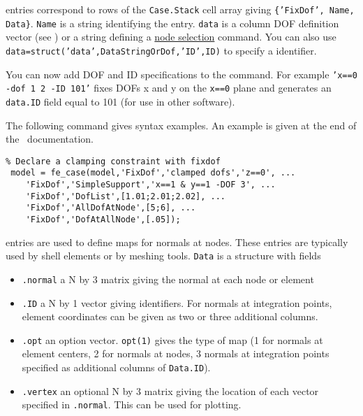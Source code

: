 
 entries correspond to rows of the {\tt Case.Stack} cell array giving {\tt \{'FixDof', Name, Data\}}. {\tt Name} is a string identifying the entry. {\tt data} is a column DOF definition vector (see ) or a string defining a \hyperlink{findnode}{node selection} command. You can also use \\{\tt data=struct('data',DataStringOrDof,'ID',ID)} to specify a identifier.

You can now add DOF and ID specifications to the  command. For example {\tt 'x==0 -dof 1 2 -ID 101'} fixes DOFs x and y on the {\tt x==0} plane and generates an {\tt data.ID} field equal to 101 (for use in other software).

The following command gives syntax examples. An example is given at the end of the \fecase\ documentation.

\begin{verbatim}
% Declare a clamping constraint with fixdof
 model = fe_case(model,'FixDof','clamped dofs','z==0', ...
    'FixDof','SimpleSupport','x==1 & y==1 -DOF 3', ...
    'FixDof','DofList',[1.01;2.01;2.02], ...
    'FixDof','AllDofAtNode',[5;6], ...
    'FixDof','DofAtAllNode',[.05]);
\end{verbatim}



 entries are used to define maps for normals at nodes. These entries are typically used by shell elements or by meshing tools. {\tt Data} is a structure with fields

\begin{itemize}
 \item {\tt .normal} a N by 3 matrix giving the normal at each node or element
 \item {\tt .ID} a N by 1 vector giving identifiers. For normals at integration points, element coordinates can be given as two or three additional columns.
 \item {\tt .opt} an option vector. {\tt opt(1)} gives the type of map (1 for normals at element centers, 2 for normals at nodes, 3 normals at integration points specified as additional columns of {\tt Data.ID}).
 \item {\tt .vertex} an optional N by 3 matrix giving the location of each vector specified in {\tt .normal}. This can be used for plotting. 
\end{itemize}

